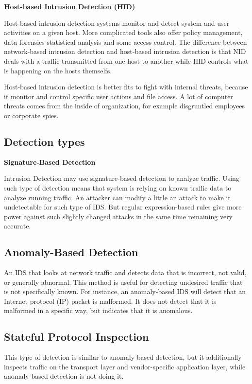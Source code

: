 \documentclass[thesis=M,english]{FITthesis}[2011/07/15]
\begin{document}
\textbf{Host-based Intrusion Detection (HID)}

Host-based intrusion detection systems monitor and detect system and user activities on a given host. More complicated tools also offer policy management, data forensics statistical analysis and some access control. The difference between network-based intrusion detection and host-based intrusion detection is that NID deals with a traffic transmitted from one host to another while HID controls what is happening on the hosts themselfs.

Host-based intrusion detection is better fits to fight with internal threats, because it monitor and control specific user actions and file access. A lot of computer threats comes from the inside of organization, for example disgruntled employees or corporate spies.

\subsection*{Detection types}

\textbf{Signature-Based Detection}

Intrusion Detection may use signature-based detection to analyze traffic. Using such type of detection means that system is relying on known traffic data to analyze running traffic. An attacker can modify a little an attack to make it undetectable for such type of IDS. But regular expression-based rules give more power against such slightly changed attacks in the same time remaining very accurate.

\subsection*{Anomaly-Based Detection}
An IDS that looks at network traffic and detects data that is incorrect, not valid, or generally abnormal. This method is useful for detecting undesired traffic that is not specifically known. For instance, an anomaly-based IDS will detect that an Internet protocol (IP) packet is malformed. It does not detect that it is malformed in a specific way, but indicates that it is anomalous.

\subsection*{Stateful Protocol Inspection}
This type of detection is similar to anomaly-based detection, but it additionally inspects traffic on the transport layer and vendor-specific application layer, while anomaly-based detection is not doing it.
\end{document}
